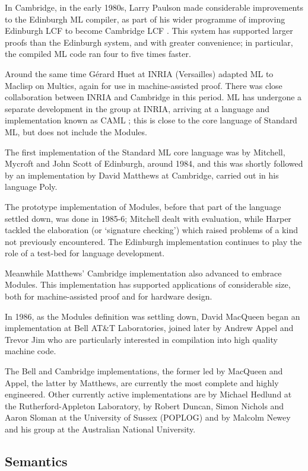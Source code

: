 In Cambridge, in the early 1980s, Larry Paulson made considerable improvements
to the Edinburgh ML compiler, as part of his wider programme of improving
Edinburgh LCF to become Cambridge LCF \cite{Pau}.  This system has supported 
larger proofs than the Edinburgh system, and with greater convenience; in 
particular, the compiled ML code ran four to five times faster.

Around the same time G\'{e}rard Huet at INRIA (Versailles) adapted ML to 
Maclisp on Multics, again for use in machine-assisted proof.  There was
close collaboration between INRIA and Cambridge in this period.
ML has undergone a separate development in the group at INRIA, arriving at a 
language and implementation known as CAML \cite{CCM}; this is close to the core 
language of Standard ML, but does not include the Modules. 

The first implementation of the Standard ML core language was by Mitchell, 
Mycroft and John Scott of Edinburgh, around 1984, and this was shortly followed
by an implementation by David Matthews at Cambridge, carried out 
in his language Poly.  

The prototype implementation of Modules, before that part
of the language settled down, was done in 1985-6;  Mitchell dealt with
evaluation, while Harper tackled the elaboration (or `signature checking')
which raised problems of a kind not previously encountered.  The Edinburgh
implementation continues to play the role of a test-bed for language
development.  

Meanwhile Matthews' Cambridge implementation also advanced to embrace
Modules. This implementation has 
supported applications of considerable size, both for machine-assisted proof
and for hardware design. 

In 1986, as the Modules definition was settling down, David MacQueen began 
an implementation at Bell AT\&T Laboratories, joined later by Andrew Appel
and Trevor Jim who are particularly interested in compilation into high quality
machine code.

The Bell and Cambridge implementations, the former led by MacQueen and Appel,
the latter by Matthews, are currently the most complete and highly engineered.
Other currently active implementations are by Michael Hedlund at the
Rutherford-Appleton Laboratory, by Robert Duncan, Simon Nichols and
Aaron Sloman at the University of Sussex (POPLOG) and by Malcolm Newey
and his group at the Australian National University.
 
\subsection*{Semantics}

